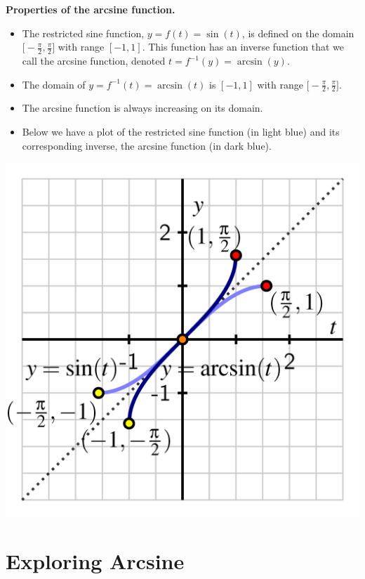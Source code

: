 \documentclass{ximera}
\begin{document}
\begin{callout}{\bf Properties of the arcsine function.}%
\begin{itemize}
\item
The restricted sine function, $y = f(t) = \sin(t)$, is defined on the domain $\Big[\!\!-\!\frac{\pi}{2},\frac{\pi}{2}\Big]$ with range $[-1,1]$.  This function has an inverse function that we call the arcsine function, denoted $t = f^{-1}(y) = \arcsin(y)$.%
\item
The domain of $y = f^{-1}(t) = \arcsin(t)$ is $[-1,1]$ with range $\Big[\!-\!\frac{\pi}{2},\frac{\pi}{2}\Big]$.%
\item
The arcsine function is always increasing on its domain.%
\item
Below we have a plot of the restricted sine function (in light blue) and its corresponding inverse, the arcsine function (in dark blue).%
\end{itemize}
\includegraphics[width=1\linewidth]{inverse-trig-arcsin-graph.png}
\end{callout}

\section{Exploring Arcsine}
\end{document}
